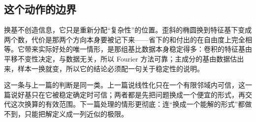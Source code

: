 \subsection{这个动作的边界}

换基不创造信息，它只是重新分配``复杂性''的位置。歪斜的椭圆换到特征基下变成两个数，代价是那两个方向本身要被记下来——省下的和付出的在自由度上完全相等。它带来实际好处的唯一情形，是那组基比数据本身稳定得多：卷积的特征基由平移不变性决定，与数据无关，所以 Fourier 方法可靠；主成分的基由数据估出来，样本一换就变，所以它的结论必须配一句关于稳定性的说明。

这一条与上一篇的判断是同一类。上一篇说线性化只在一个有限邻域内可信，这一篇说好基只在它被稳定确定时可信；两者都是先把问题换成一个便宜的形式，再交代这次换算的有效范围。下一篇处理的情形更彻底：连``换成一个能解的形式''都做不到，只能把解定义成一列近似的极限。
